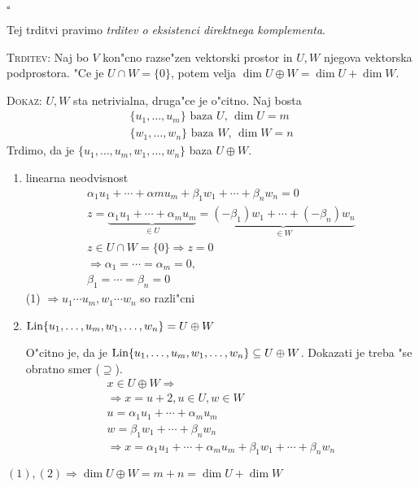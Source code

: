 \hfill $\square$

Tej trditvi pravimo \emph{trditev o eksistenci direktnega komplementa}.

\textsc{Trditev:} Naj bo $V$ kon"cno razse"zen vektorski prostor in $U, W$ njegova vektorska podprostora. "Ce je $U \cap W = \{0\}$, potem velja $\dim U \oplus W = \dim U + \dim W$.

\textsc{Dokaz:} $U, W$ sta netrivialna, druga"ce je o"citno. Naj bosta
\begin{gather*}
\{u_1, \ldots, u_m\} \text{ baza $U$, $\dim U = m$} \\
\{w_1, \ldots, w_n\} \text{ baza $W$, $\dim W = n$}
\end{gather*}
Trdimo, da je $\{u_1, \ldots, u_m , w_1, \ldots, w_n\}$ baza $U \oplus W$.
\begin{enumerate}
	\item linearna neodvisnost
	\begin{gather*}
	\alpha_1 u_1 + \cdots + \alpha m u_m + \beta_1 w_1 + \cdots + \beta_n w_n = 0 \\
	z = \underbrace{\alpha_1 u_1 + \cdots + \alpha_m u_m}_{\in U} = \underbrace{(-\beta_1)w_1 + \cdots + (-\beta_n)w_n}_{\in W} \\
	z \in U \cap W = \{0\} \Rightarrow z = 0 \\
	\Rightarrow \alpha_1 = \cdots = \alpha_m = 0, \\
	\beta_1 = \cdots = \beta_n = 0
	\end{gather*}
	(1) $\Rightarrow u_1 \cdots u_m, w_1 \cdots w_n$ so razli"cni
	
	\item $\text{Lin} \{u_1, \ldots, u_m, w_1, \ldots, w_n\} = U \oplus W$

	O"citno je, da je $\text{Lin} \{u_1, \ldots, u_m, w_1, \ldots, w_n\} \subseteq U \oplus W$. Dokazati je treba "se obratno smer ($\supseteq$).
	\begin{gather*}
	x \in U \oplus W \Rightarrow \\
	\Rightarrow x = u + 2, u \in U, w \in W \\
	u = \alpha_1 u_1 + \cdots + \alpha_m u_m \\
	w = \beta_1 w_1 + \cdots + \beta_n w_n \\
	\Rightarrow x = \alpha_1 u_1 + \cdots + \alpha_m u_m + \beta_1 w_1 + \cdots + \beta_n w_n
	\end{gather*}
\end{enumerate}
$(1), (2) \Rightarrow \dim U \oplus W = m + n = \dim U + \dim W$

